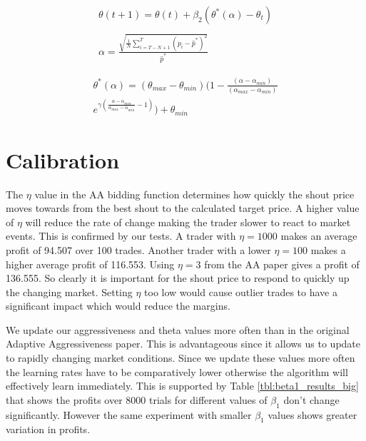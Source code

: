 \documentclass[preprint]{acm_proc_article-sp} %
\begin{document}
\begin{equation}
\label{eqn:update_theta}
\begin{split}
    \theta(t+1)=\theta(t)+\beta_2(\theta^*(\alpha)-\theta_t)\\\\
    \alpha = \frac{\sqrt{\frac 1 N \sum^T_{i=T-N+1}(p_i-\hat p^*)^2}}{\hat p^*}
\end{split}
\end{equation}

\begin{equation}
  \begin{split}
    \label{eqn:theta_star}
    \theta^*(\alpha) = (\theta_{max}-\theta_{min})
    (1-\frac{(\alpha-\alpha_{min})}{(\alpha_{max} -\alpha_{min})} \\
    e^{\gamma(\frac{\alpha-\alpha_{min}}{\alpha_{max}-\alpha_{min}}-1)})
    + \theta_{min}
  \end{split}
\end{equation}

\section{Calibration} \label{sec:calibration}
The $\eta$ value in the AA bidding function determines how quickly the shout
price moves towards from the best shout to the calculated target price. A
higher value of $\eta$ will reduce the rate of change making the trader slower
to react to market events. This is confirmed by our tests. A trader with $\eta
= 1000$ makes an average profit of 94.507 over 100 trades. Another trader with
a lower $\eta = 100$ makes a higher average profit of 116.553. Using $\eta = 3$
from the AA paper gives a profit of 136.555. So clearly it is important for the
shout price to respond to quickly up the changing market. Setting $\eta$ too
low would cause outlier trades to have a significant impact which would reduce
the margins.

We update our aggressiveness and theta values more often than in the original Adaptive Aggressiveness 
paper\cite{AA_thesis}. This is advantageous since it allows us to update to rapidly changing market 
conditions. Since we update these values more often the learning rates have to be comparatively lower 
otherwise the algorithm will effectively learn immediately. This is supported by Table \ref{tbl:beta1_results_big} that shows 
the profits over 8000 trials for different values of $\beta_1$ don't change significantly. However 
the same experiment with smaller $\beta_1$ values shows greater variation in profits.
\end{document}
